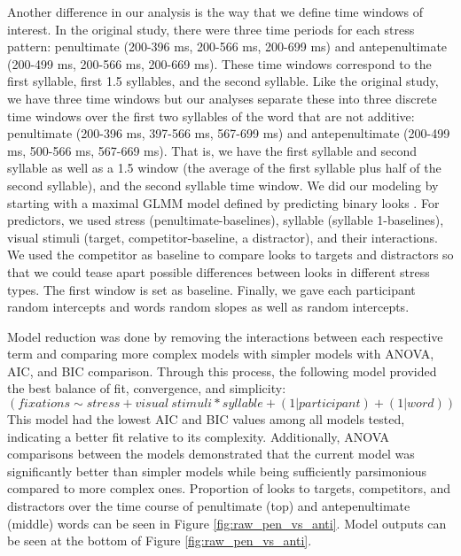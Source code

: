Another difference in our analysis is the way that we define time windows of interest. In the original study, there were three time periods for each stress pattern: penultimate (200-396 ms, 200-566 ms, 200-699 ms) and antepenultimate (200-499 ms, 200-566 ms, 200-669 ms). These time windows correspond to the first syllable, first 1.5 syllables, and the second syllable. Like the original study, we have three time windows but our analyses separate these into three discrete time windows over the first two syllables of the word that are not additive: penultimate (200-396 ms, 397-566 ms, 567-699 ms) and antepenultimate (200-499 ms, 500-566 ms, 567-669 ms). That is, we have the first syllable and second syllable as well as a 1.5 window (the average of the first syllable plus half of the second syllable), and the second syllable time window. We did our modeling by starting with a maximal GLMM model defined by predicting binary looks \citep{Barr_2008}. For predictors, we used stress (penultimate-baselines), syllable (syllable 1-baselines), visual stimuli (target, competitor-baseline, a distractor), and their interactions. We used the competitor as baseline to compare looks to targets and distractors so that we could tease apart possible differences between looks in different stress types. The first window is set as baseline. Finally, we gave each participant random intercepts and words random slopes as well as random intercepts.

Model reduction was done by removing the interactions between each respective term and comparing more complex models with simpler models with ANOVA, AIC, and BIC comparison. Through this process, the following model provided the best balance of fit, convergence, and simplicity: $$(fixations \sim stress + visual\ stimuli * syllable + (1|participant)+(1|word))$$  This model had the lowest AIC and BIC values among all models tested, indicating a better fit relative to its complexity. Additionally, ANOVA comparisons between the models demonstrated that the current model was significantly better than simpler models while being sufficiently parsimonious compared to more complex ones. Proportion of looks to targets, competitors, and distractors over the time course of penultimate (top) and antepenultimate (middle) words can be seen in Figure \ref{fig:raw_pen_vs_anti}. Model outputs can be seen at the bottom of Figure \ref{fig:raw_pen_vs_anti}.

